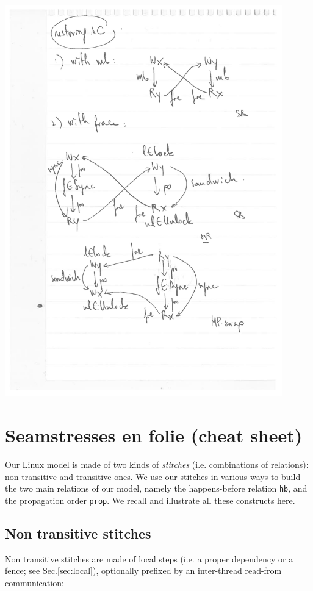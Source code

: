 \documentclass[a4paper]{article}
\begin{document}
\includegraphics[width=12cm]{sc}

\pagebreak

\section{Seamstresses en folie (cheat sheet)}

Our Linux model is made of two kinds of \emph{stitches} (i.e. combinations of
relations): non-transitive and transitive ones. We use our stitches in various
ways to build the two main relations of our model, namely the happens-before
relation {\tt hb}, and the propagation order {\tt prop}. We recall and
illustrate all these constructs here.

\subsection{Non transitive stitches}

Non transitive stitches are made of local steps (i.e. a proper dependency or a
fence; see Sec.\ref{sec:local}), optionally prefixed by an inter-thread
read-from communication:
\end{document}

